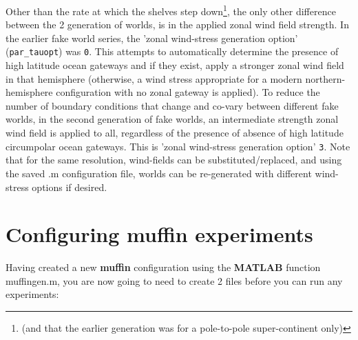 \documentclass[11pt,fleqn]{book} %
\begin{document}
Other than the rate at which the shelves step down\footnote{(and that the earlier generation was for a pole-to-pole super-continent only)}, the only other difference between the 2 generation of worlds, is in the applied zonal wind field strength. In the earlier fake world series, the 'zonal wind-stress generation option' (\texttt{par\_tauopt}) was \texttt{0}. This attempts to automatically determine the presence of high latitude ocean gateways and if they exist, apply a stronger zonal wind field in that hemisphere (otherwise, a wind stress appropriate for a modern northern-hemisphere configuration with no zonal gateway is applied). To reduce the number of boundary conditions that change and co-vary between different fake worlds, in the second generation of fake worlds, an intermediate strength zonal wind field is applied to all, regardless of the presence of absence of high latitude circumpolar ocean gateways. This is  'zonal wind-stress generation option' \texttt{3}. Note that for the same resolution, wind-fields can be substituted/replaced, and using the saved \textsf{\footnotesize .m} configuration file, worlds can be re-generated with different wind-stress options if desired.

%
%

\newpage

\section{Configuring muffin experiments}


Having created a new \textbf{muffin} configuration using the \textbf{MATLAB} function \textsf{\footnotesize muffingen.m}, you are now going to need to create 2 files before you can run any experiments: 
\end{document}
